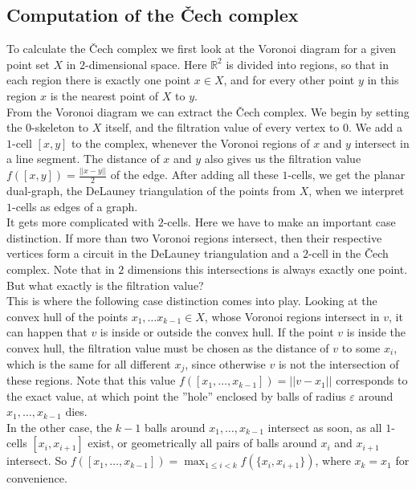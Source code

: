 \documentclass[11pt, a4paper, UKenglish]{article}
\newcommand{\bR}{\mathbb{R}}
\begin{document}
    \subsection{Computation of the Čech complex}\label{subsec:čech-complex}

    To calculate the Čech complex we first look at the Voronoi diagram for a given point set $X$ in $2$-dimensional space.
    Here $\bR^2$ is divided into regions, so that in each region there is exactly one point $x\in X$, and for every other point $y$ in this region $x$ is the nearest point of $X$ to $y$.\\
    From the Voronoi diagram we can extract the Čech complex.
    We begin by setting the $0$-skeleton to $X$ itself, and the filtration value of every vertex to $0$.
    We add a $1$-cell $[x,y]$ to the complex, whenever the Voronoi regions of $x$ and $y$ intersect in a line segment.
    The distance of $x$ and $y$ also gives us the filtration value $f([x,y]) = \frac{||x-y||}{2}$ of the edge.
    After adding all these $1$-cells, we get the planar dual-graph, the DeLauney triangulation of the points from $X$, when we interpret $1$-cells as edges of a graph.\\
    It gets more complicated with $2$-cells.
    Here we have to make an important case distinction.
    If more than two Voronoi regions intersect, then their respective vertices form a circuit in the DeLauney triangulation and a $2$-cell in the Čech complex.
    Note that in $2$ dimensions this intersections is always exactly one point.
    But what exactly is the filtration value?\\
    This is where the following case distinction comes into play.
    Looking at the convex hull of the points $x_1,\ldots x_{k-1}\in X$, whose Voronoi regions intersect in $v$, it can happen that $v$ is inside or outside the convex hull.
    If the point $v$ is inside the convex hull, the filtration value must be chosen as the distance of $v$ to some $x_i$, which is the same for all different $x_j$, since otherwise $v$ is not the intersection of these regions.
    Note that this value $f([x_1,\ldots,x_{k-1}])=||v-x_1||$ corresponds to the exact value, at which point the ''hole'' enclosed by balls of radius $\varepsilon$ around $x_1,\ldots,x_{k-1}$ dies.\\
    
    In the other case, the $k-1$ balls around $x_1,\ldots,x_{k-1}$ intersect as soon, as all $1$-cells $[x_i,x_{i+1}]$ exist, or geometrically all pairs of balls around $x_i$ and $x_{i+1}$ intersect.
    So $f([x_1,\ldots,x_{k-1}])=\max_{1\leq i<k} f(\{x_i,x_{i+1}\})$, where $x_k=x_1$ for convenience.
\end{document}
